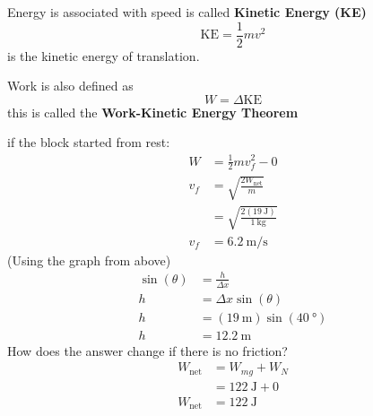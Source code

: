 \documentclass{article}
\begin{document}
Energy is associated with speed is called \textbf{Kinetic Energy (KE)}
$$ \text{KE} = \frac{1}{2}mv^2 $$
is the kinetic energy of translation.

Work is also defined as $$ W = \Delta \text{KE} $$
this is called the \textbf{Work-Kinetic Energy Theorem}

if the block started from rest:
\begin{align*}
	W & = \frac{1}{2}mv_f^2 - 0 \\
	v_f & = \sqrt{\frac{2W_\text{net}}{m}} \\
		& = \sqrt{\frac{2(\SI{19}{\joule})}{\SI{1}{\kilogram}}} \\
	v_f & = \SI{6.2}{\meter \per \second}
\end{align*}
(Using the graph from above)
\begin{align*}
	\sin(\theta) & = \frac{h}{\Delta x} \\
	h & = \Delta x\sin(\theta) \\
	h & = (\SI{19}{\meter})\sin(\SI{40}{\degree}) \\
	h & = \SI{12.2}{\meter}
\end{align*}
How does the answer change if there is no friction?
\begin{align*}
	W_\text{net} & = W_{mg} + W_N \\
				 & = \SI{122}{\joule} + 0 \\
	W_\text{net} & = \SI{122}{\joule}
\end{align*}

\hr

\end{document}
